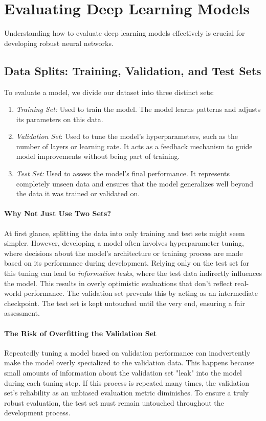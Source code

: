 \section{Evaluating Deep Learning Models}
Understanding how to evaluate deep learning models effectively is crucial for developing robust neural networks.

\subsection{Data Splits: Training, Validation, and Test Sets}
To evaluate a model, we divide our dataset into three distinct sets:

\begin{enumerate}
    \item \textit{Training Set:} Used to train the model. The model learns patterns and adjusts its parameters on this data.
    \item \textit{Validation Set}: Used to tune the model’s hyperparameters, such as the number of layers or learning rate. It acts as a feedback mechanism to guide model improvements without being part of training.
    \item \textit{Test Set:} Used to assess the model’s final performance. It represents completely unseen data and ensures that the model generalizes well beyond the data it was trained or validated on.
\end{enumerate}

\paragraph{Why Not Just Use Two Sets? \newline}

At first glance, splitting the data into only training and test sets might seem simpler. However, developing a model often involves hyperparameter tuning, where decisions about the model’s architecture or training process are made based on its performance during development. Relying only on the test set for this tuning can lead to \textit{information leaks}, where the test data indirectly influences the model. This results in overly optimistic evaluations that don’t reflect real-world performance. The validation set prevents this by acting as an intermediate checkpoint. The test set is kept untouched until the very end, ensuring a fair assessment.

\paragraph{The Risk of Overfitting the Validation Set\newline}

Repeatedly tuning a model based on validation performance can inadvertently make the model overly specialized to the validation data. This happens because small amounts of information about the validation set "leak" into the model during each tuning step. If this process is repeated many times, the validation set’s reliability as an unbiased evaluation metric diminishes. To ensure a truly robust evaluation, the test set must remain untouched throughout the development process.

